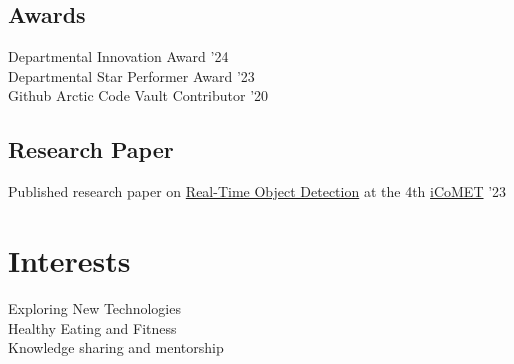 \documentclass[]{deedy-resume-openfont}
\begin{document}
\begin{minipage}[t]{0.33\textwidth}
\subsection{Awards }
\location{}
  \textbullet{} Departmental Innovation Award  {\scriptsize '24}\\
  \vspace{0.1 em}
\textbullet{}  Departmental Star Performer Award {\scriptsize '23}\\
\vspace{0.1 em}
\textbullet{}  Github Arctic Code Vault Contributor {\scriptsize '20}\\
\vspace{0.1 em}

\subsection{Research Paper }
\location{}
 \textbullet{} Published research paper on \href{https://ieeexplore.ieee.org/document/10099364}{Real-Time Object Detection} at the 4th \href{https://www.ieee.org/conferences/index.html}{iCoMET} {\scriptsize '23}\\ 
 \sectionsep

\section{Interests}
\location{}
 \textbullet{}  Exploring New Technologies \\
\textbullet{}   Healthy Eating and Fitness  \\
\textbullet{}   Knowledge sharing and mentorship\\
 \sectionsep


%
%

\end{minipage} 
\hfill
\end{document}
